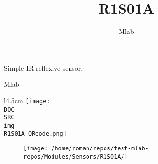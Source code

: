 \documentclass[12pt,a4paper]{article}
\author{ Mlab }
\title{ R1S01A }
\begin{document}
\fontsize{14.4}{20}\selectfont

\vspace*{\fill}

\begin{center}
{\Huge 
Simple IR reflexive sensor.
}

{\Large Mlab}

\vspace*{\fill}
\vspace*{1cm}

\end{center}

\begin{wrapfigure}{l}{4.5cm}
    \texttt{[image: \\DOC\\SRC\\img\\R1S01A\_QRcode.png]}
\end{wrapfigure}




\vspace*{\fill}
\vfill
\vspace*{1cm}

\begin{figure}[ht!]
\centering
\texttt{[image: /home/roman/repos/test-mlab-repos/Modules/Sensors/R1S01A/]} 
\end{figure}





\newpage



\end{document}
